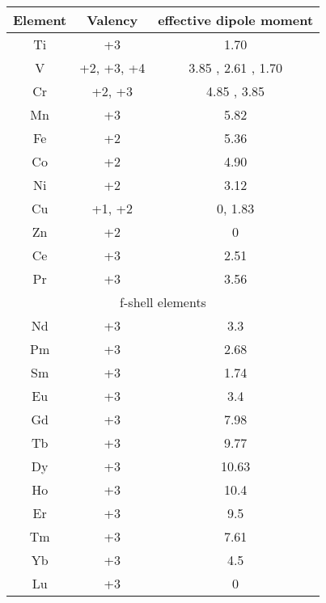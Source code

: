 \documentclass[journal]{IEEEtran}
\begin{document}
\begin{multicols}{2}
		



	\begin{tabular*}{10pt}[h]{|c|c|c|}
				\hline
		Element & Valency & effective dipole moment \\
		\hline
		Ti & +3 & 1.70 \\
		\hline
		V & +2, +3, +4 & 3.85 , 2.61 , 1.70 \\
		\hline
		Cr & +2, +3 & 4.85 , 3.85 \\
		\hline
		Mn & +3 & 5.82 \\
		\hline
		Fe & +2 & 5.36 \\
		\hline
		Co & +2 & 4.90 \\
		\hline
		Ni & +2 & 3.12 \\
		\hline
		Cu & +1, +2 & 0, 1.83 \\
		\hline
		Zn & +2  & 0 \\
		\hline
		Ce & +3 & 2.51 \\
		\hline
		Pr & +3 & 3.56 \\
		\hline
		\multicolumn{3}{c}{f-shell elements} \\
		\hline
		Nd & +3 & 3.3 \\
		\hline
		Pm & +3 & 2.68 \\
		\hline
		Sm & +3 & 1.74 \\
		\hline
		Eu & +3 & 3.4 \\
		\hline
		Gd & +3 & 7.98 \\
		\hline
		Tb & +3 & 9.77 \\
		\hline
		Dy & +3 & 10.63 \\
		\hline
		Ho & +3 & 10.4 \\
		\hline 
		Er & +3 & 9.5 \\
		\hline
		Tm & +3 & 7.61 \\
		\hline
		Yb & +3 & 4.5 \\
		\hline
		Lu & +3 & 0 \\
		\hline
		
		
	\end{tabular*}



\scalebox{0.7}{


}
\end{multicols}
\end{document}
